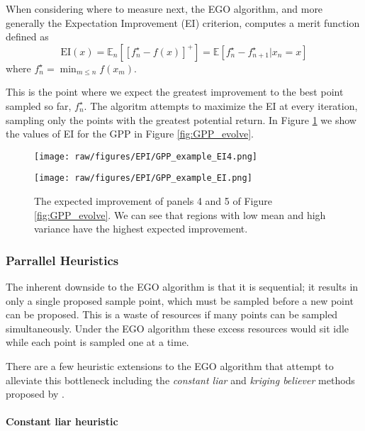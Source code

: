 When considering where to measure next, the EGO algorithm, and more generally the Expectation Improvement (EI) criterion, computes a merit function defined as
\begin{equation}
 \mbox{EI}(x) = \mathbb{E}_{n} \left[\left[ f_{n}^{\star} - f(x) \right]^{+} \right] = \mathbb{E} \left[ f_{n}^{\star} - f_{n+1}^{\star}| x_{n} = x\right]
\end{equation}
where $f_{n}^{\star} = \min_{m \leq n} f(x_{m})$.

This is the point where we expect the greatest improvement to the best point sampled so far, $f_{n}^{\star}$. The algoritm attempts to maximize the EI at every iteration, sampling only the points with the greatest potential return. In Figure \ref{fig:GPP_EI_evolve} we show the values of EI for the GPP in Figure \ref{fig:GPP_evolve}.

\begin{figure}[hpt]
 	\centerline{\texttt{[image: raw/figures/EPI/GPP\_example\_EI4.png]}}
    \centerline{\texttt{[image: raw/figures/EPI/GPP\_example\_EI.png]}}
    \caption[Evolution of expected improvement of a GPP]{The expected improvement of panels 4 and 5 of Figure \ref{fig:GPP_evolve}. We can see that regions with low mean and high variance have the highest expected improvement.}
 	\label{fig:GPP_EI_evolve}
\end{figure}

\subsubsection{Parrallel Heuristics}

The inherent downside to the EGO algorithm is that it is sequential; it results in only a single proposed sample point, which must be sampled before a new point can be proposed. This is a waste of resources if many points can be sampled simultaneously. Under the EGO algorithm these excess resources would sit idle while each point is sampled one at a time.

There are a few heuristic extensions to the EGO algorithm that attempt to alleviate this bottleneck including the {\it constant liar} and {\it kriging believer} methods proposed by \cite{Ginsbourger2008}.

\paragraph{Constant liar heuristic}

